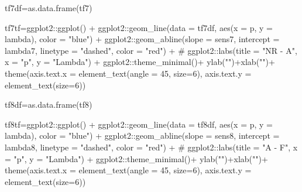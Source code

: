\documentclass[
  12pt,
  letterpaper,
]{book}
\newenvironment{Shaded}{\begin{snugshade}}{\end{snugshade}}
\newcommand{\AttributeTok}[1]{\textcolor[rgb]{0.40,0.45,0.13}{#1}}
\newcommand{\CommentTok}[1]{\textcolor[rgb]{0.37,0.37,0.37}{#1}}
\newcommand{\DecValTok}[1]{\textcolor[rgb]{0.68,0.00,0.00}{#1}}
\newcommand{\FunctionTok}[1]{\textcolor[rgb]{0.28,0.35,0.67}{#1}}
\newcommand{\NormalTok}[1]{\textcolor[rgb]{0.00,0.23,0.31}{#1}}
\newcommand{\OtherTok}[1]{\textcolor[rgb]{0.00,0.23,0.31}{#1}}
\newcommand{\SpecialCharTok}[1]{\textcolor[rgb]{0.37,0.37,0.37}{#1}}
\newcommand{\StringTok}[1]{\textcolor[rgb]{0.13,0.47,0.30}{#1}}
\begin{document}
\begin{Shaded}
\begin{Highlighting}[]
\NormalTok{tf7df}\OtherTok{=}\FunctionTok{as.data.frame}\NormalTok{(tf7)}

\NormalTok{tf7tf}\OtherTok{=}\NormalTok{ggplot2}\SpecialCharTok{::}\FunctionTok{ggplot}\NormalTok{() }\SpecialCharTok{+}
\NormalTok{  ggplot2}\SpecialCharTok{::}\FunctionTok{geom\_line}\NormalTok{(}\AttributeTok{data =}\NormalTok{ tf7df, }\FunctionTok{aes}\NormalTok{(}\AttributeTok{x =}\NormalTok{ p, }\AttributeTok{y =}\NormalTok{ lambda), }\AttributeTok{color =} \StringTok{"blue"}\NormalTok{) }\SpecialCharTok{+}
\NormalTok{  ggplot2}\SpecialCharTok{::}\FunctionTok{geom\_abline}\NormalTok{(}\AttributeTok{slope =}\NormalTok{ sens7, }\AttributeTok{intercept =}\NormalTok{ lambda7, }\AttributeTok{linetype =} \StringTok{"dashed"}\NormalTok{, }\AttributeTok{color =} \StringTok{"red"}\NormalTok{) }\SpecialCharTok{+}
 \CommentTok{\# ggplot2::labs(title = "NR {-} A", x = "p", y = "Lambda") +}
\NormalTok{  ggplot2}\SpecialCharTok{::}\FunctionTok{theme\_minimal}\NormalTok{()}\SpecialCharTok{+}
  \FunctionTok{ylab}\NormalTok{(}\StringTok{""}\NormalTok{)}\SpecialCharTok{+}\FunctionTok{xlab}\NormalTok{(}\StringTok{""}\NormalTok{)}\SpecialCharTok{+}
  \FunctionTok{theme}\NormalTok{(}\AttributeTok{axis.text.x =} \FunctionTok{element\_text}\NormalTok{(}\AttributeTok{angle =} \DecValTok{45}\NormalTok{, }\AttributeTok{size=}\DecValTok{6}\NormalTok{),}
        \AttributeTok{axis.text.y =} \FunctionTok{element\_text}\NormalTok{(}\AttributeTok{size=}\DecValTok{6}\NormalTok{))}

\NormalTok{tf8df}\OtherTok{=}\FunctionTok{as.data.frame}\NormalTok{(tf8)}

\NormalTok{tf8tf}\OtherTok{=}\NormalTok{ggplot2}\SpecialCharTok{::}\FunctionTok{ggplot}\NormalTok{() }\SpecialCharTok{+}
\NormalTok{  ggplot2}\SpecialCharTok{::}\FunctionTok{geom\_line}\NormalTok{(}\AttributeTok{data =}\NormalTok{ tf8df, }\FunctionTok{aes}\NormalTok{(}\AttributeTok{x =}\NormalTok{ p, }\AttributeTok{y =}\NormalTok{ lambda), }\AttributeTok{color =} \StringTok{"blue"}\NormalTok{) }\SpecialCharTok{+}
\NormalTok{  ggplot2}\SpecialCharTok{::}\FunctionTok{geom\_abline}\NormalTok{(}\AttributeTok{slope =}\NormalTok{ sens8, }\AttributeTok{intercept =}\NormalTok{ lambda8, }\AttributeTok{linetype =} \StringTok{"dashed"}\NormalTok{, }\AttributeTok{color =} \StringTok{"red"}\NormalTok{) }\SpecialCharTok{+}
 \CommentTok{\# ggplot2::labs(title = "A {-} F", x = "p", y = "Lambda") +}
\NormalTok{  ggplot2}\SpecialCharTok{::}\FunctionTok{theme\_minimal}\NormalTok{()}\SpecialCharTok{+}
  \FunctionTok{ylab}\NormalTok{(}\StringTok{""}\NormalTok{)}\SpecialCharTok{+}\FunctionTok{xlab}\NormalTok{(}\StringTok{""}\NormalTok{)}\SpecialCharTok{+}
  \FunctionTok{theme}\NormalTok{(}\AttributeTok{axis.text.x =} \FunctionTok{element\_text}\NormalTok{(}\AttributeTok{angle =} \DecValTok{45}\NormalTok{, }\AttributeTok{size=}\DecValTok{6}\NormalTok{),}
        \AttributeTok{axis.text.y =} \FunctionTok{element\_text}\NormalTok{(}\AttributeTok{size=}\DecValTok{6}\NormalTok{))}


\end{Highlighting}
\end{Shaded}
\end{document}
